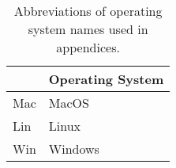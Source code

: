 \begin{table}
\centering
\caption{Abbreviations of operating system names used in appendices.}
\label{tab:keys-os}
\begin{tabular}{ll}
\toprule
{} & Operating System \\
\midrule
 Mac &            MacOS \\
 Lin &            Linux \\
 Win &          Windows \\
\bottomrule
\end{tabular}
\end{table}
\pagebreak